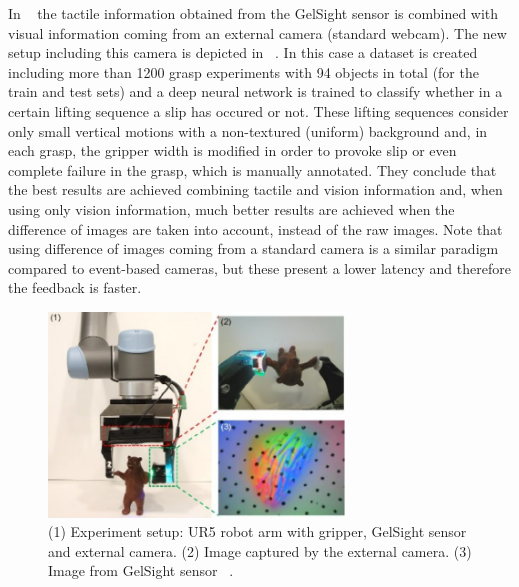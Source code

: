 In ~\cite{gelsight2018} the tactile information obtained from the GelSight sensor is combined with visual information coming from an external camera (standard webcam). The new setup including this camera is depicted in ~. In this case a dataset is created including more than 1200 grasp experiments with 94 objects in total (for the train and test sets) and a deep neural network is trained to classify whether in a certain lifting sequence a slip has occured or not. These lifting sequences consider only small vertical motions with a non-textured (uniform) background and, in each grasp, the gripper width is modified in order to provoke slip or even complete failure in the grasp, which is manually annotated. They conclude that the best results are achieved combining tactile and vision information and, when using only vision information, much better results are achieved when the difference of images are taken into account, instead of the raw images. Note that using difference of images coming from a standard camera is a similar paradigm compared to event-based cameras, but these present a lower latency and therefore the feedback is faster.

\begin{figure}[h]
    \centering
    \includegraphics[width=0.7\textwidth]{resources/images/gelsight}
    \caption{(1) Experiment setup: UR5 robot arm with gripper, GelSight sensor and external camera. (2) Image captured by the external camera. (3) Image from GelSight sensor ~\cite{gelsight2018}.}\label{fig:gelsight}
\end{figure}

